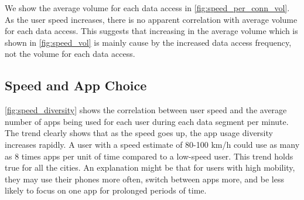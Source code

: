 We show the average volume for each data access in \autoref{fig:speed_per_conn_vol}. As the user speed increases, there is no apparent correlation with average volume for each data access. This suggests that increasing in the average volume which is shown in \autoref{fig:speed_vol} is mainly cause by the increased data access frequency, not the volume for each data access.

\subsection{Speed and App Choice}


\autoref{fig:speed_diversity} shows the correlation between user speed and the average number of apps being used for each user during each data segment per minute.
The trend clearly shows that as the speed goes up, the app usage diversity increases rapidly.
A user with a speed estimate of 80-100 km/h could use as many as 8 times apps per unit of time compared to a low-speed user.
This trend holds true for all the cities. An explanation might be that for users with high mobility, they may use their phones more often, switch between apps more, and be less likely to focus on one app for prolonged periods of time. 

